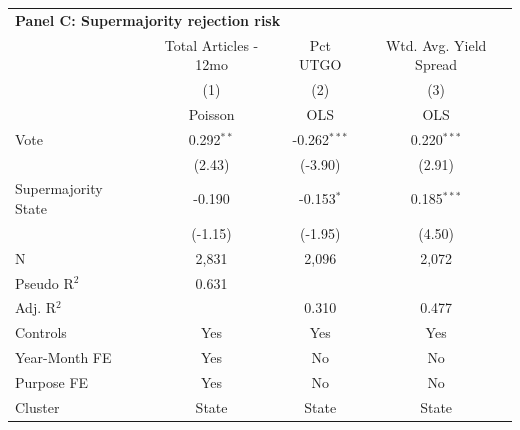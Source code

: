 \begingroup
\centering
\begin{tabular*}{\textwidth}{@{\extracolsep{\fill}}lccc}
\multicolumn{4}{l}{\textbf{Panel C: Supermajority rejection risk}}\\
\addlinespace
   \toprule
                       & Total Articles - 12mo & Pct UTGO       & Wtd. Avg. Yield Spread\\
                       & (1)            & (2)            & (3)\\
                       &  Poisson       & OLS            & OLS\\
   \midrule
   Vote                & 0.292$^{**}$   & -0.262$^{***}$ & 0.220$^{***}$\\
                       & (2.43)        & (-3.90)       & (2.91)\\
   Supermajority State & -0.190         & -0.153$^{*}$   & 0.185$^{***}$\\
                       & (-1.15)       & (-1.95)       & (4.50)\\
   \hline
   N        & 2,831          & 2,096          & 2,072\\
   Pseudo R$^2$               & 0.631 &  & \\
   Adj. R$^2$                 &  & 0.310 & 0.477\\
   Controls                   & Yes & Yes & Yes\\
   Year-Month FE       & Yes            & No             & No\\
   Purpose FE          & Yes            & No             & No\\
   Cluster              & State & State & State\\
   \bottomrule
\end{tabular*}
\par\endgroup

